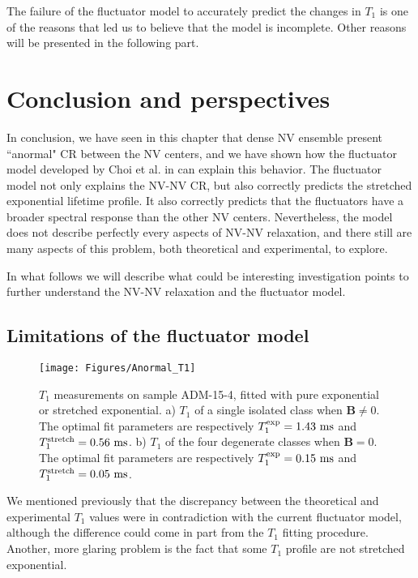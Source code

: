 \documentclass[a4paper,11pt]{report}
\begin{document}
The failure of the fluctuator model to accurately predict the changes in $T_1$ is one of the reasons that led us to believe that the model is incomplete. Other reasons will be presented in the following part.

\section{Conclusion and perspectives}

In conclusion, we have seen in this chapter that dense NV ensemble present ``anormal" CR between the NV centers, and we have shown how the fluctuator model developed by Choi et al. in \citep{choi2017depolarization} can explain this behavior. The fluctuator model not only explains the NV-NV CR, but also correctly predicts the stretched exponential lifetime profile. It also correctly predicts that the fluctuators have a broader spectral response than the other NV centers. Nevertheless, the model does not describe perfectly every aspects of NV-NV relaxation, and there still are many aspects of this problem, both theoretical and experimental, to explore.

In what follows we will describe what could be interesting investigation points to further understand the NV-NV relaxation and the fluctuator model.

\subsection{Limitations of the fluctuator model}
\begin{figure}[h]
\centering
\texttt{[image: Figures/Anormal\_T1]}
\caption{$T_1$ measurements on sample ADM-15-4, fitted with pure exponential or stretched exponential. a) $T_1$ of a single isolated class when $\mathbf{B} \neq 0$. The optimal fit parameters are respectively $T_1^{\rm exp}=1.43\ \rm ms$ and $T_1^{\rm stretch}=0.56\ \rm ms$. b) $T_1$ of the four degenerate classes when $\mathbf{B}=0$. The optimal fit parameters are respectively $T_1^{\rm exp}=0.15\ \rm ms$ and $T_1^{\rm stretch}=0.05\ \rm ms$.}
\label{anormal T1}
\end{figure}

We mentioned previously that the discrepancy between the theoretical and experimental $T_1$  values were in contradiction with the current fluctuator model, although the difference could come in part from the $T_1$ fitting procedure. Another, more glaring problem is the fact that some $T_1$ profile are not stretched exponential.
\end{document}
